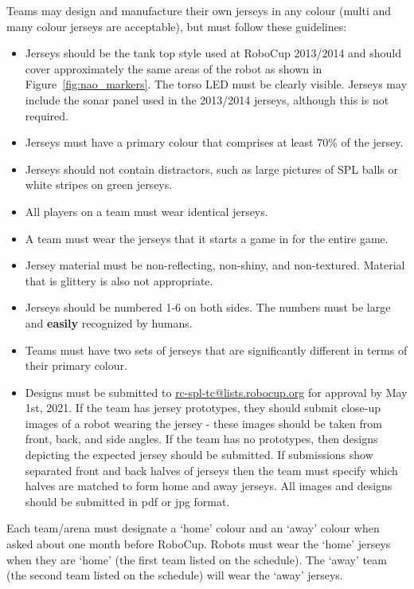 Teams may design and manufacture their own jerseys in any colour (multi and many colour jerseys are acceptable), but must follow these guidelines:
\begin{itemize}
	\item Jerseys should be the tank top style used at RoboCup 2013/2014 and should cover approximately the same areas of the robot as shown in Figure~\ref{fig:nao_markers}.  The torso LED must be clearly visible.  Jerseys may include the sonar panel used in the 2013/2014 jerseys, although this is not required.
	\item Jerseys must have a primary colour that comprises at least 70\% of the jersey.
	\item Jerseys should not contain distractors, such as large pictures of SPL balls or white stripes on green jerseys.
	\item All players on a team must wear identical jerseys.
	\item A team must wear the jerseys that it starts a game in for the entire game.
	\item Jersey material must be non-reflecting, non-shiny, and non-textured.  Material that is glittery is also not appropriate.
	\item Jerseys should be numbered 1-6 on both sides.  The numbers must be large and {\bf easily} recognized by humans.
	\item Teams must have two sets of jerseys that are significantly different in terms of their primary colour.
	\item Designs must be submitted to \url{rc-spl-tc@lists.robocup.org} for approval by May 1st, 2021. If the team has jersey prototypes, they should submit close-up images of a robot wearing the jersey - these images should be taken from front, back, and side angles.  If the team has no prototypes, then designs depicting the expected jersey should be submitted.  If submissions show separated front and back halves of jerseys then the team must specify which halves are matched to form home and away jerseys.  All images and designs should be submitted in pdf or jpg format.
\end{itemize}

Each team/arena must designate a `home' colour and an `away' colour when asked about one month before RoboCup. Robots must wear the `home' jerseys when they are `home' (the first team listed on the schedule). The `away' team (the second team listed on the schedule) will wear the `away' jerseys.

